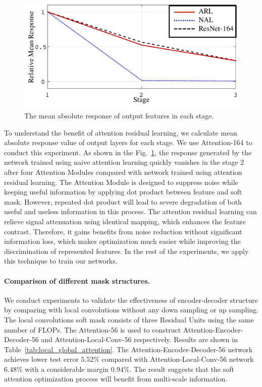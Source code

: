 \documentclass[10pt,twocolumn,letterpaper]{article}
\begin{document}
%
\begin{figure}[t]
\setlength{\abovecaptionskip}{0pt}
\setlength{\belowcaptionskip}{-15pt}
\begin{center}
  \includegraphics[width=1\linewidth]{mean_value.pdf}
\end{center}
   \caption{The mean absolute response of output features in each stage. }
\label{fig:mean_response}
\end{figure}
To understand the benefit of attention residual learning, we calculate mean absolute response value of output layers for each stage. We use Attention-164 to conduct this experiment.
%
As shown in the Fig.~\ref{fig:mean_response}, the response generated by the network trained using naive attention learning quickly vanishes in the stage 2 after four Attention Modules compared with network trained using attention residual learning.
%
The Attention Module is designed to suppress noise while keeping useful information by applying dot product between feature and soft mask. However, repeated dot product will lead to severe degradation of both useful and useless information in this process.
%
The attention residual learning can relieve signal attenuation using identical mapping, which enhances the feature contrast.
%
Therefore, it gains benefits from noise reduction without significant information loss, which makes optimization much easier while improving the discrimination of represented features.
%
In the rest of the experiments, we apply this technique to train our networks.

\paragraph{Comparison of different mask structures.}
\label{para:Comparison}
We conduct experiments to validate the effectiveness of encoder-decoder structure by comparing with local convolutions without any down sampling or up sampling. The local convolutions soft mask consists of three Residual Units using the same number of FLOPs.
%
The Attention-56 is used to construct Attention-Encoder-Decoder-56 and Attention-Local-Conv-56 respectively.
%
Results are shown in Table~\ref{tab:local_global_attention}.
%
The Attention-Encoder-Decoder-56 network achieves lower test error $5.52\%$ compared with Attention-Local-Conv-56 network $6.48\%$ with a considerable margin $0.94\%$. The result suggests that the soft attention optimization process will benefit from multi-scale information.
\end{document}
